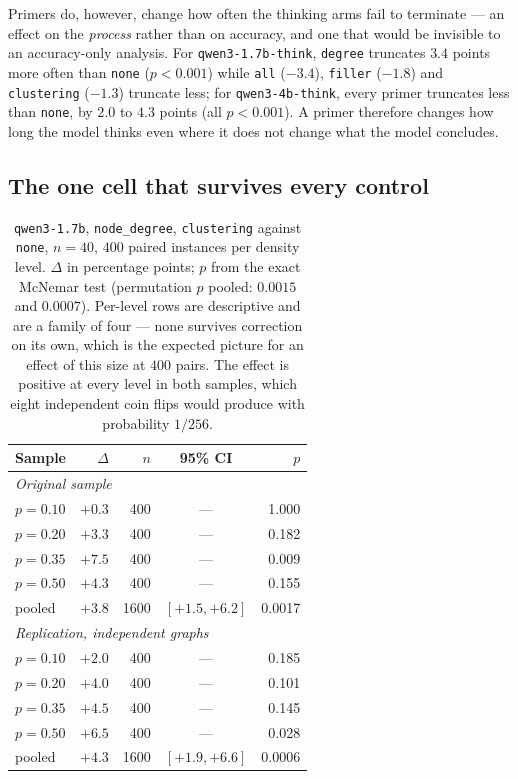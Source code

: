 \documentclass[11pt]{article}
\begin{document}
Primers do, however, change how often the thinking arms fail to terminate
--- an effect on the \emph{process} rather than on accuracy, and one that
would be invisible to an accuracy-only analysis. For
\texttt{qwen3-1.7b-think}, \texttt{degree} truncates $3.4$ points more
often than \texttt{none} ($p < 0.001$) while \texttt{all} ($-3.4$),
\texttt{filler} ($-1.8$) and \texttt{clustering} ($-1.3$) truncate less;
for \texttt{qwen3-4b-think}, every primer truncates less than
\texttt{none}, by $2.0$ to $4.3$ points (all $p < 0.001$). A primer
therefore changes how long the model thinks even where it does not change
what the model concludes.

\subsection{The one cell that survives every control}
\label{sec:results-headline}

\begin{table}[t]
\centering
\small
\begin{tabular}{lrrcr}
\toprule
Sample & $\Delta$ & $n$ & 95\% CI & $p$ \\
\midrule
\multicolumn{5}{l}{\emph{Original sample}} \\
$p=0.10$    & $+0.3$ & 400 & --- & 1.000 \\
$p=0.20$    & $+3.3$ & 400 & --- & 0.182 \\
$p=0.35$    & $+7.5$ & 400 & --- & 0.009 \\
$p=0.50$    & $+4.3$ & 400 & --- & 0.155 \\
pooled      & $+3.8$ & 1600 & $[+1.5, +6.2]$ & 0.0017 \\
\midrule
\multicolumn{5}{l}{\emph{Replication, independent graphs}} \\
$p=0.10$    & $+2.0$ & 400 & --- & 0.185 \\
$p=0.20$    & $+4.0$ & 400 & --- & 0.101 \\
$p=0.35$    & $+4.5$ & 400 & --- & 0.145 \\
$p=0.50$    & $+6.5$ & 400 & --- & 0.028 \\
pooled      & $+4.3$ & 1600 & $[+1.9, +6.6]$ & 0.0006 \\
\bottomrule
\end{tabular}
\caption{\texttt{qwen3-1.7b}, \texttt{node\_degree}, \texttt{clustering}
against \texttt{none}, $n{=}40$, $400$ paired instances per density level.
$\Delta$ in percentage points; $p$ from the exact McNemar test
(permutation $p$ pooled: $0.0015$ and $0.0007$). Per-level rows are
descriptive and are a family of four --- none survives correction on its
own, which is the expected picture for an effect of this size at $400$
pairs. The effect is positive at every level in both samples, which eight
independent coin flips would produce with probability $1/256$.}
\label{tab:headline}
\end{table}
\end{document}
